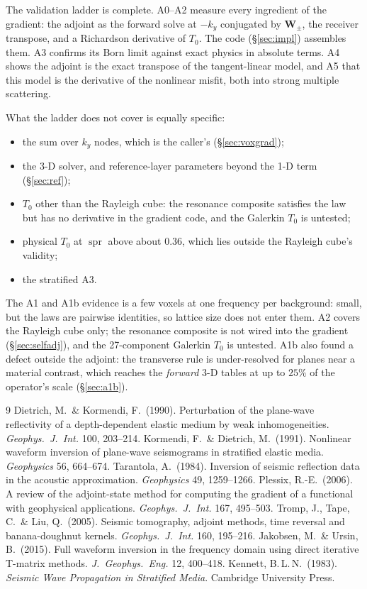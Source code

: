 \documentclass[11pt,a4paper]{article}
\newcommand{\Tz}{T_0}
\begin{document}
The validation ladder is complete. A0--A2 measure every ingredient of the gradient: the adjoint as
the forward solve at $-k_y$ conjugated by $\mathbf{W}_{\pm}$, the receiver transpose, and a Richardson
derivative of $\Tz$. The code (\S\ref{sec:impl}) assembles them. A3 confirms its Born limit
against exact physics in absolute terms. A4 shows the adjoint is the exact transpose of the
tangent-linear model, and A5 that this model is the derivative of the nonlinear misfit, both into
strong multiple scattering.

What the ladder does not cover is equally specific:
\begin{itemize}
\item the sum over $k_y$ nodes, which is the caller's (\S\ref{sec:voxgrad});
\item the 3-D solver, and reference-layer parameters beyond the 1-D term (\S\ref{sec:ref});
\item $\Tz$ other than the Rayleigh cube: the resonance composite satisfies the law but has no
  derivative in the gradient code, and the Galerkin $\Tz$ is untested;
\item physical $\Tz$ at $\operatorname{spr}$ above about $0.36$, which lies outside the Rayleigh cube's validity;
\item the stratified A3.
\end{itemize}
The A1 and A1b evidence is a few voxels at one frequency per background: small, but the laws are
pairwise identities, so lattice size does not enter them. A2 covers the Rayleigh cube only; the
resonance composite is not wired into the gradient (\S\ref{sec:selfadj}), and the 27-component
Galerkin $\Tz$ is untested.
A1b also found a defect outside the adjoint: the transverse rule is under-resolved for
planes near a material contrast, which reaches the \emph{forward} 3-D tables at up to $25\%$ of
the operator's scale (\S\ref{sec:a1b}).

\begin{thebibliography}{9}\small
{} Dietrich, M.\ \& Kormendi, F.\ (1990). Perturbation of the plane-wave reflectivity
  of a depth-dependent elastic medium by weak inhomogeneities. \emph{Geophys.\ J.\ Int.} 100,
  203--214.
 Kormendi, F.\ \& Dietrich, M.\ (1991). Nonlinear waveform inversion of plane-wave
  seismograms in stratified elastic media. \emph{Geophysics} 56, 664--674.
 Tarantola, A.\ (1984). Inversion of seismic reflection data in the acoustic
  approximation. \emph{Geophysics} 49, 1259--1266.
 Plessix, R.-E.\ (2006). A review of the adjoint-state method for computing the
  gradient of a functional with geophysical applications. \emph{Geophys.\ J.\ Int.} 167, 495--503.
 Tromp, J., Tape, C.\ \& Liu, Q.\ (2005). Seismic tomography, adjoint methods, time
  reversal and banana-doughnut kernels. \emph{Geophys.\ J.\ Int.} 160, 195--216.
 Jakobsen, M.\ \& Ursin, B.\ (2015). Full waveform inversion in the frequency domain
  using direct iterative T-matrix methods. \emph{J.\ Geophys.\ Eng.} 12, 400--418.
 Kennett, B.\,L.\,N.\ (1983). \emph{Seismic Wave Propagation in Stratified Media}.
  Cambridge University Press.
\end{thebibliography}
\end{document}
